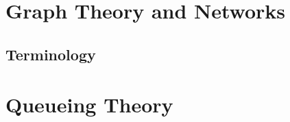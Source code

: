 \chapter{Graph Theory and Networks}
\section{Terminology}



\chapter{Queueing Theory}














%



